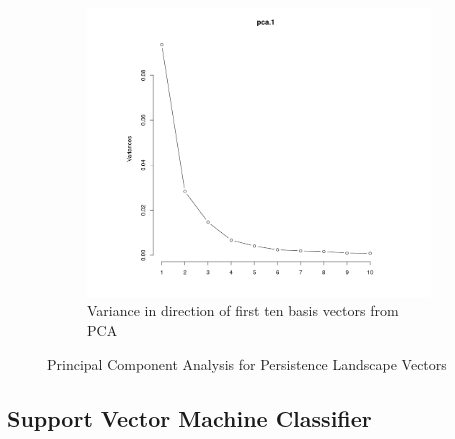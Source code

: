 \documentclass[11pt, reqno]{amsart}
\theoremstyle{plain}
\theoremstyle{definition}
\begin{document}
\begin{figure}
\begin{subfigure}{.5\textwidth}
  \includegraphics[width=\linewidth]{nv_mel_PL_PCA_Vietoris_Rips.png}
  \caption{Variance in direction of first ten basis vectors from PCA}
\end{subfigure}
\caption{Principal Component Analysis for Persistence Landscape Vectors}
\label{fig:PCA_PL}
\end{figure}

\subsection{Support Vector Machine Classifier}
\end{document}
